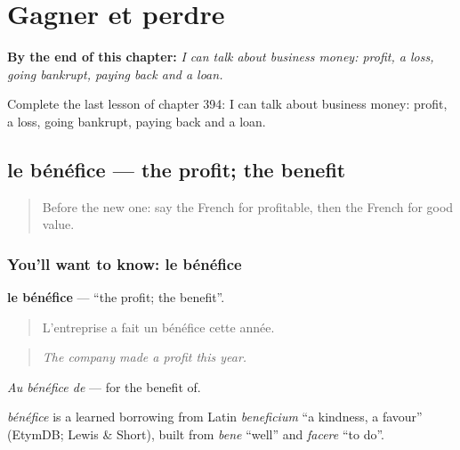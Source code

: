 
\chapter{Gagner et perdre}
\label{ch:fr-gagner-et-perdre}

\begin{chapteropening}
\textbf{By the end of this chapter:} \emph{I can talk about business money: profit, a loss, going bankrupt, paying back and a loan.}

Complete the last lesson of chapter 394: I can talk about business money: profit, a loss, going bankrupt, paying back and a loan.
\end{chapteropening}

\section[le bénéfice]{le bénéfice — the profit; the benefit}

\label{lesson:FR-C394-benefice}



\begin{quote}
Before the new one: say the French for profitable, then the French for good value.
\end{quote}

\subsection*{You'll want to know: le bénéfice}
\textbf{le bénéfice} — \textquotedblleft{}the profit; the benefit\textquotedblright{}.

\begin{quote}
L'entreprise a fait un bénéfice cette année.
\end{quote}

\begin{quote}
\emph{The company made a profit this year.}
\end{quote}

\emph{Au bénéfice de} — for the benefit of.

\begin{cousinweb}
\emph{bénéfice} is a learned borrowing from Latin \emph{beneficium} \textquotedblleft{}a kindness, a favour\textquotedblright{} (EtymDB; Lewis \& Short), built from \emph{bene} \textquotedblleft{}well\textquotedblright{} and \emph{facere} \textquotedblleft{}to do\textquotedblright{}.
\end{cousinweb}

